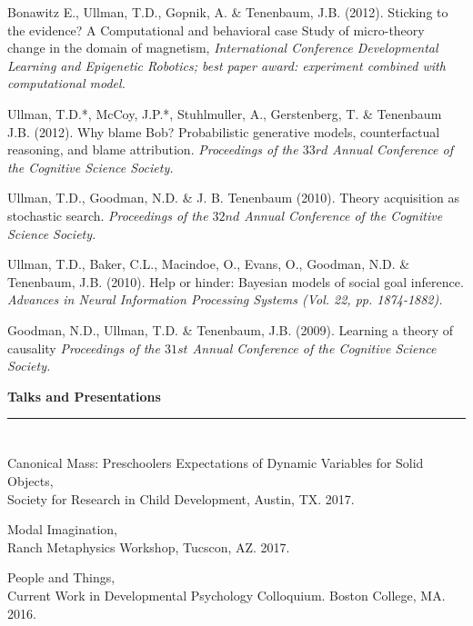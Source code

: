 \documentclass[margin,line,pifont,palatino,courier]{res}
\begin{document}
\begin{resume}
Bonawitz E., Ullman, T.D., Gopnik, A. \& Tenenbaum, J.B. (2012). Sticking to the evidence? A Computational and behavioral case Study of micro-theory change in the domain of magnetism, \textit{International Conference Developmental Learning and Epigenetic Robotics; best paper award: experiment combined with computational model.}

Ullman, T.D.*, McCoy, J.P.*, Stuhlmuller, A., Gerstenberg, T. \& Tenenbaum J.B. (2012). Why blame Bob? Probabilistic generative models, counterfactual reasoning, and blame attribution. \textit{Proceedings of the $33rd$ Annual Conference of the Cognitive Science Society.}

Ullman, T.D., Goodman, N.D. \& J. B. Tenenbaum (2010). Theory acquisition as stochastic search. \textit{Proceedings of the $32nd$ Annual Conference of the Cognitive Science Society.}

Ullman, T.D., Baker, C.L., Macindoe, O., Evans, O., Goodman, N.D. \& Tenenbaum, J.B. (2010). Help or hinder: Bayesian models of social goal inference. \textit{Advances in Neural Information Processing Systems (Vol. 22, pp. 1874-1882).}

Goodman, N.D., Ullman, T.D. \& Tenenbaum, J.B. (2009). Learning a theory of causality \textit{Proceedings of the $31st$ Annual Conference of the Cognitive Science Society.}

\vspace{20pt}
\begin{adjustwidth*}{-3.3cm}{-2cm}

\hspace{-3.8em}\textbf{Talks and Presentations}\\
\hspace*{-3.8em}\noindent\rule{8cm}{0.4pt}

\end{adjustwidth*}

\section{\sc }

Canonical Mass: Preschoolers Expectations of Dynamic Variables for Solid Objects,\\
Society for Research in Child Development, Austin, TX. 2017.

Modal Imagination,\\ Ranch Metaphysics Workshop, Tucscon, AZ. 2017.

People and Things,\\ Current Work in Developmental Psychology Colloquium. Boston College, MA. 2016. 


\end{resume}
\end{document}
